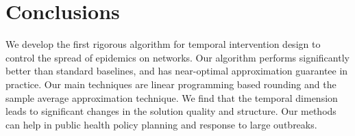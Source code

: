 \section{Conclusions}
\label{sec:conc}

We develop the first rigorous algorithm for temporal intervention design to control the spread of epidemics on networks. Our algorithm performs significantly better than standard baselines, and has near-optimal approximation guarantee in practice. Our main techniques are linear programming based rounding and the sample average approximation technique.
We find that the temporal dimension leads to significant changes in the solution quality and structure. Our methods can help in public health policy planning and response to large outbreaks. 
